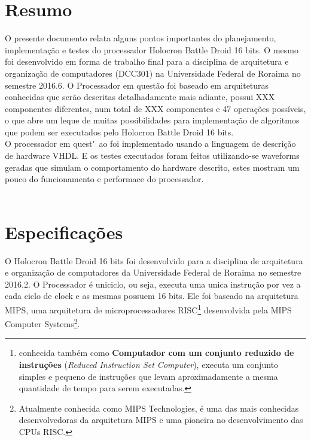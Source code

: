 \documentclass{article}
\newcommand\tab[1][0.50cm]{\hspace*{#1}}
\begin{document}

	\section*{Resumo}
	\thispagestyle{empty}	
		\tab O presente documento relata alguns pontos importantes do planejamento, implementa\c{c}\~{a}o e testes do processador Holocron Battle Droid 16 bits. O mesmo foi desenvolvido em forma de trabalho final para a disciplina de arquitetura e organiza\c{c}\~{a}o de computadores (DCC301) na Universidade Federal de Roraima no semestre 2016.6. O Processador em quest\~ao foi baseado em arquiteturas conhecidas que ser\~ao descritas detalhadamente mais adiante, possui XXX componentes diferentes, num total de XXX componentes e 47 opera\c{c}\~{o}es poss\'iveis, o que abre um leque de muitas possibilidades para implementa\c{c}\~{a}o de algoritmos que podem ser executados pelo Holocron Battle Droid 16 bits.\\
		\tab O processador em quest\'~ao foi implementado usando a linguagem de descri\c{c}\~{a}o de hardware VHDL. E os testes executados foram feitos utilizando-se waveforms geradas que simulam o comportamento do hardware descrito, estes mostram um pouco do funcionamento e performace do processador.\\ \\
	
	\cleardoublepage
	

	\tableofcontents
	\thispagestyle{empty}
	\cleardoublepage
	

	\listoffigures
	\cleardoublepage
	

	\listoftables
	\cleardoublepage
	

	\section{Especifica\c{c}\~{o}es}
		\tab O Holocron Battle Droid 16 bits foi desenvolvido para a disciplina de arquitetura e organiza\c{c}\~{a}o de computadores da Universidade Federal de Roraima no semestre 2016.2. O Processador \'{e} uniciclo, ou seja, executa uma unica instru\c{c}\~{a}o por vez a cada ciclo de clock e as mesmas possuem 16 bits. Ele foi baseado na arquitetura MIPS,  uma arquitetura de microprocessadores RISC\footnote{conhecida tamb\'{e}m como \textbf{Computador com um conjunto reduzido de instru\c{c}\~{o}es} (\textit{Reduced Instruction Set Computer}), executa um conjunto simples e pequeno de instru\c{c}\~{o}es que levam aproximadamente a mesma quantidade de tempo para serem executadas.} desenvolvida pela MIPS Computer Systems\footnote{Atualmente conhecida como MIPS Technologies, é uma das mais conhecidas desenvolvedoras da arquitetura MIPS e uma pioneira no desenvolvimento das CPUs RISC.}.
\end{document}
